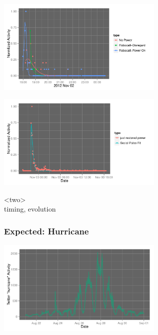 \documentclass{beamer}
\begin{document}
\begin{frame}
  \begin{center}
    \includegraphics[width=8cm]{./imgs/fake_fit2.pdf}
  \end{center}
\end{frame}


\begin{frame}
  \begin{center}
    \includegraphics[width=8cm]{./imgs/real_fit.pdf}
  \end{center}
\end{frame}


\begin{frame}
\begin{center}
{\Huge <two> \\ [10pt] timing, evolution}
\end{center}
\end{frame}


\begin{frame}\frametitle{Expected: Hurricane}
  \begin{center}
    \includegraphics[width=8cm]{./imgs/hurricane.pdf}
  \end{center}
\end{frame}
\end{document}
